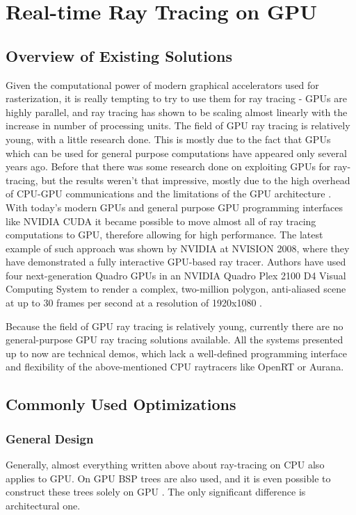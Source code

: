 \documentclass{article}
\begin{document}
\newpage
\section{Real-time Ray Tracing on GPU}

\subsection{Overview of Existing Solutions}
Given the computational power of modern graphical accelerators used for rasterization, it is really tempting to try to use them for ray tracing - GPUs are highly parallel, and ray tracing has shown to be scaling almost linearly with the increase in number of processing units. The field of GPU ray tracing is relatively young, with a little research done. This is mostly due to the fact that GPUs which can be used for general purpose computations have appeared only several years ago. Before that there was some research done on exploiting GPUs for ray-tracing, but the results weren't that impressive, mostly due to the high overhead of CPU-GPU communications and the limitations of the GPU architecture \cite{purcell02}. With today's modern GPUs and general purpose GPU programming interfaces like NVIDIA CUDA \cite{cuda} it became possible to move almost all of ray tracing computations to GPU, therefore allowing for high performance. The latest example of such approach was shown by NVIDIA at NVISION 2008, where they have demonstrated a fully interactive GPU-based ray tracer. Authors have used four next-generation Quadro GPUs in an NVIDIA Quadro Plex 2100 D4 Visual Computing System to render a complex, two-million polygon, anti-aliased scene at up to 30 frames per second at a resolution of 1920x1080 \cite{luebke08}.

Because the field of GPU ray tracing is relatively young, currently there are no general-purpose GPU ray tracing solutions available. All the systems presented up to now are technical demos, which lack a well-defined programming interface and flexibility of the above-mentioned CPU raytracers like OpenRT or Aurana.

\subsection{Commonly Used Optimizations}

\subsubsection{General Design}
Generally, almost everything written above about ray-tracing on CPU also applies to GPU. On GPU BSP trees are also used, and it is even possible to construct these trees solely on GPU \cite{zhou08}. The only significant difference is architectural one.
\end{document}
